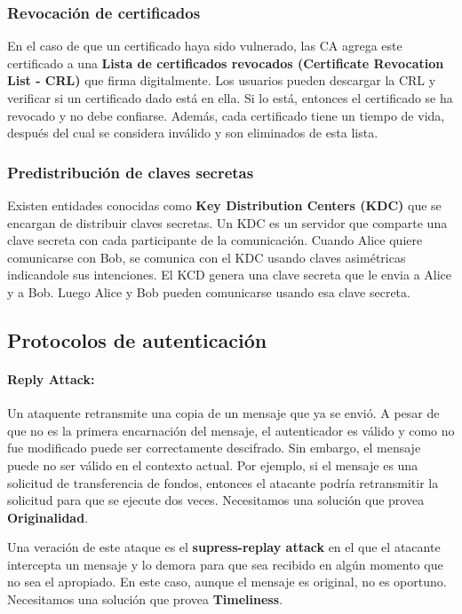 \subsubsection*{Revocación de certificados}
En el caso de que un certificado haya sido vulnerado, las CA agrega este certificado a una \textbf{Lista de certificados revocados (Certificate Revocation List - CRL)} que firma digitalmente. Los usuarios pueden descargar la CRL y verificar si un certificado dado está en ella. Si lo está, entonces el certificado se ha revocado y no debe confiarse. Además, cada certificado tiene un tiempo de vida, después del cual se considera inválido y son eliminados de esta lista.

\subsubsection{Predistribución de claves secretas}
Existen entidades conocidas como \textbf{Key Distribution Centers (KDC)} que se encargan de distribuir claves secretas. Un KDC es un servidor que comparte una clave secreta con cada participante de la comunicación. Cuando Alice quiere comunicarse con Bob, se comunica con el KDC usando claves asimétricas indicandole sus intenciones. El KCD genera una clave secreta que le envia a Alice y a Bob. Luego Alice y Bob pueden comunicarse usando esa clave secreta.

\subsection{Protocolos
 de autenticación}
\paragraph{Reply Attack:} Un ataquente retransmite una copia de un mensaje que ya se envió. A pesar de que no es la primera encarnación del mensaje, el autenticador es válido y como no fue modificado puede ser correctamente descifrado. Sin embargo, el mensaje puede no ser válido en el contexto actual. Por ejemplo, si el mensaje es una solicitud de transferencia de fondos, entonces el atacante podría retransmitir la solicitud para que se ejecute dos veces. Necesitamos una solución que provea \textbf{Originalidad}.

Una veración de este ataque es el \textbf{supress-replay attack} en el que el atacante intercepta un mensaje y lo demora para que sea recibido en algún momento que no sea el apropiado. En este caso, aunque el mensaje es original, no es oportuno. Necesitamos una solución que provea \textbf{Timeliness}.

